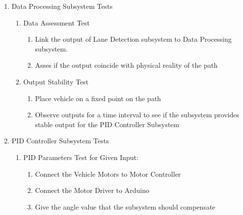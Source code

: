 \documentclass[a4paper,12pt]{article}
\begin{document}
\begin{enumerate}
\item {Data Processing Subsystem Tests}	

\begin{enumerate}

\item Data Assessment Test

\begin{enumerate}

\item Link the output of Lane Detection subsystem to Data Processing subsystem.  

\item Asses if the output coincide with physical reality of the path  

\end{enumerate}

\item Output Stability Test

\begin{enumerate}
	
	\item Place vehicle on a fixed point on the path
	
	\item Observe outputs for a time interval to see if the subsystem provides stable output for the PID Controller Subsystem
	
\end{enumerate}



\end{enumerate}







\item {PID Controller Subsystem Tests}	

\begin{enumerate}



\item PID Parameters Test for Given Input:	 \label{test:a}	

\begin{enumerate}

\item Connect the Vehicle Motors to Motor Controller  

\item Connect the Motor Driver to Arduino  

\item Give the angle value that the subsystem should compensate   


\end{enumerate}
\end{enumerate}
\end{enumerate}
\end{document}
